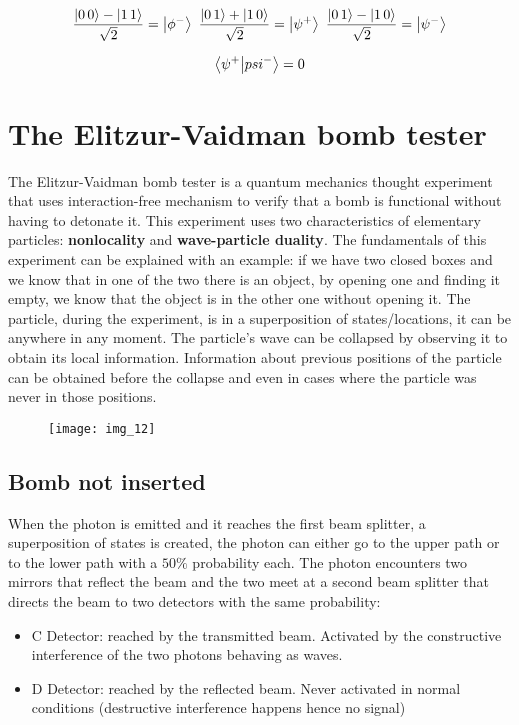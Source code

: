 	$$\frac{\ket{0\,0}-\ket{1\,1}}{\sqrt{2}}=\ket{\phi^-}\,\,\frac{\ket{0\,1}+\ket{1\,0}}{\sqrt{2}}=\ket{\psi^+}\,\,\frac{\ket{0\,1}-\ket{1\,0}}{\sqrt{2}}=\ket{\psi^-}$$

	$$\braket{\psi^+}{psi^-}=0$$

\section{The Elitzur-Vaidman bomb tester}
The Elitzur-Vaidman bomb tester is a quantum mechanics thought experiment that uses interaction-free mechanism to verify that a bomb is functional without having to detonate it.
This experiment uses two characteristics of elementary particles: \textbf{nonlocality} and \textbf{wave-particle duality}.
The fundamentals of this experiment can be explained with an example: if we have two closed boxes and we know that in one of the two there is an object, by opening one and finding it empty, we know that the object is in the other one without opening it.
The particle, during the experiment, is in a superposition of states/locations, it can be anywhere in any moment.
The particle's wave can be collapsed by observing it to obtain its local information.
Information about previous positions of the particle can be obtained before the collapse and even in cases where the particle was never in those positions.

\begin{figure}[htbp!]
	\centering
	\texttt{[image: img\_12]}
\end{figure}


	\subsection{Bomb not inserted}
When the photon is emitted and it reaches the first beam splitter, a superposition of states is created, the photon can either go to the upper path or to the lower path with a $50\%$ probability each.
The photon encounters two mirrors that reflect the beam and the two meet at a second beam splitter that directs the beam to two detectors with the same probability:

\begin{multicols}{2}
	\begin{itemize}
		\item C Detector: reached by the transmitted beam.
	Activated by the constructive interference of the two photons behaving as waves.
		\item D Detector: reached by the reflected beam.
	Never activated in normal conditions (destructive interference happens hence no signal)
	\end{itemize}
\end{multicols}

